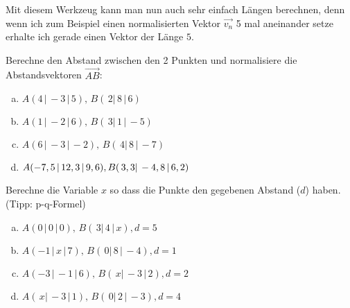 \documentclass[a4paper,12pt]{article}
\newcommand{\Aufgabe}[2]{
	{
		\vspace*{0.3cm}
		\begin{tcolorbox}[breakable,colback=yellow!0,colframe=black!65!white,title=\textbf{Aufgabe #1:},width=\linewidth ]
			{#2}
		\end{tcolorbox}
		
		
	}
}
\begin{document}
	Mit diesem Werkzeug kann man nun auch sehr einfach Längen berechnen, denn wenn ich zum Beispiel einen 
	normalisierten
	Vektor  $\vec{v_n}$ 5 mal aneinander setze erhalte ich gerade einen Vektor der Länge $5$.
	\Aufgabe{ (Betrag berechnen)}{
		Berechne den Abstand zwischen den 2 Punkten und normalisiere die Abstandsvektoren $\vec{AB}$:
		\begin{multicols}{2}
			\begin{enumerate}[(a)]
				\item $A(4\,|\,-3\,|\,5),\, B(\,2 |\,8 \,|\, 6)$
				\item $A(1\,|\,-2\,|\,6),\, B(\,3 |\,1 \,|\, -5)$\\
				\item $A(6\,|\,-3\,|\,-2),\, B(\,4 |\,8 \,|\, -7)$
				\item $A(-7,5\,|\,12,3\,|\,9,6),\, \\B(\,3,3 |\,-4,8 \,|\, 6,2)$
			\end{enumerate}
		\end{multicols}
	}
	\Aufgabe{ (Betrag Rückrechnung) }{
		Berechne die Variable $x$ so dass die Punkte den gegebenen Abstand ($d$) haben. (Tipp: p-q-Formel)
		\begin{multicols}{2}
			\begin{enumerate}[(a)]
				\item $A(0\,|\,0\,|\,0),\, B(\,3 |\,4 \,|\, x), d=5$
				\item $A(-1\,|\,x\,|\,7),\, B(\,0 |\,8 \,|\, -4), d=1$
				\item $A(-3\,|\,-1\,|\,6),\, B(\,x |\,-3 \,|\, 2), d=2$
				\item $A(\,x |\,-3 \,|\, 1),\, B(\,0 |\,2 \,|\, -3), d=4$
			\end{enumerate}
		\end{multicols}%
	}
\end{document}
